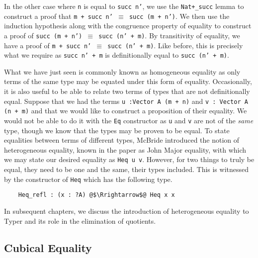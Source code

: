 \documentclass[12pt,twoside,maitrise]{dms}
\theoremstyle{definition}
\numberwithin{equation}{section}
\numberwithin{table}{chapter}
\numberwithin{figure}{chapter}
\newcommand\id[1] {\texttt{#1}}
\newcommand\fn[1] {\texttt{#1}}
\begin{document}
In the other case where \id{n} is equal to \fn{succ n'}, we use the
\id{Nat+\_succ} lemma to construct a proof that \fn{m + succ n' $\equiv$ succ
  (m + n')}. We then use the induction hypothesis along with the congruence
property of equality to construct a proof of \fn{succ (m + n') $\equiv$ succ
  (n' + m)}. By transitivity of equality, we have a proof of \fn{m + succ n'
  $\equiv$ succ (n' + m)}. Like before, this is precisely what we require as
\fn{succ n' + m} is definitionally equal to \fn{succ (n' + m)}.

What we have just seen is commonly known as homogeneous equality as only terms
of the same type may be equated under this form of equality. Occasionally, it is
also useful to be able to relate two terms of types that are not definitionally
equal. Suppose that we had the terms \fn{u :\@ Vector A (m + n)} and \fn{v :\@
  Vector A (n + m)} and that we would like to construct a proposition of their
equality. We would not be able to do it with the \fn{Eq} constructor as \id{u}
and \id{v} are not of the \emph{same} type, though we know that the types may be
proven to be equal. To state equalities between terms of different types,
McBride introduced the notion of heterogeneous
equality\cite{mcbride2000dependently}, known in the paper as John Major
equality, with which we may state our desired equality as \fn{Heq u v}. However,
for two things to truly be equal, they need to be one and the same, their types
included. This is witnessed by the constructor of \fn{Heq} which has the
following type.

\begin{verbatim}
    Heq_refl : (x : ?A) @$\Rrightarrow$@ Heq x x
\end{verbatim}

In subsequent chapters, we discuss the introduction of heterogeneous equality to
Typer and its role in the elimination of quotients.


\subsection*{Cubical Equality}\label{subsec:intro-cubical-equality}
\end{document}

